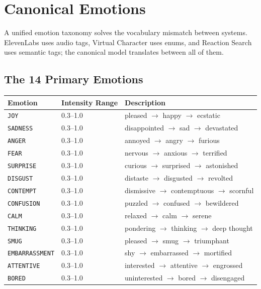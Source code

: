 \documentclass[11pt,letterpaper]{article}
\renewcommand{\arraystretch}{1.3}
\begin{document}
\section{Canonical Emotions}

\begin{tldrbox}
A unified emotion taxonomy solves the vocabulary mismatch between systems. ElevenLabs uses audio tags, Virtual Character uses enums, and Reaction Search uses semantic tags; the canonical model translates between all of them.
\end{tldrbox}

\subsection{The 14 Primary Emotions}

\begin{center}
\renewcommand{\arraystretch}{1.2}
\begin{tabular}{llL{7cm}}
\toprule
\textbf{Emotion} & \textbf{Intensity Range} & \textbf{Description} \\
\midrule
\texttt{JOY} & 0.3--1.0 & pleased $\rightarrow$ happy $\rightarrow$ ecstatic \\
\texttt{SADNESS} & 0.3--1.0 & disappointed $\rightarrow$ sad $\rightarrow$ devastated \\
\texttt{ANGER} & 0.3--1.0 & annoyed $\rightarrow$ angry $\rightarrow$ furious \\
\texttt{FEAR} & 0.3--1.0 & nervous $\rightarrow$ anxious $\rightarrow$ terrified \\
\texttt{SURPRISE} & 0.3--1.0 & curious $\rightarrow$ surprised $\rightarrow$ astonished \\
\texttt{DISGUST} & 0.3--1.0 & distaste $\rightarrow$ disgusted $\rightarrow$ revolted \\
\texttt{CONTEMPT} & 0.3--1.0 & dismissive $\rightarrow$ contemptuous $\rightarrow$ scornful \\
\texttt{CONFUSION} & 0.3--1.0 & puzzled $\rightarrow$ confused $\rightarrow$ bewildered \\
\texttt{CALM} & 0.3--1.0 & relaxed $\rightarrow$ calm $\rightarrow$ serene \\
\texttt{THINKING} & 0.3--1.0 & pondering $\rightarrow$ thinking $\rightarrow$ deep thought \\
\texttt{SMUG} & 0.3--1.0 & pleased $\rightarrow$ smug $\rightarrow$ triumphant \\
\texttt{EMBARRASSMENT} & 0.3--1.0 & shy $\rightarrow$ embarrassed $\rightarrow$ mortified \\
\texttt{ATTENTIVE} & 0.3--1.0 & interested $\rightarrow$ attentive $\rightarrow$ engrossed \\
\texttt{BORED} & 0.3--1.0 & uninterested $\rightarrow$ bored $\rightarrow$ disengaged \\
\bottomrule
\end{tabular}
\end{center}
\end{document}
